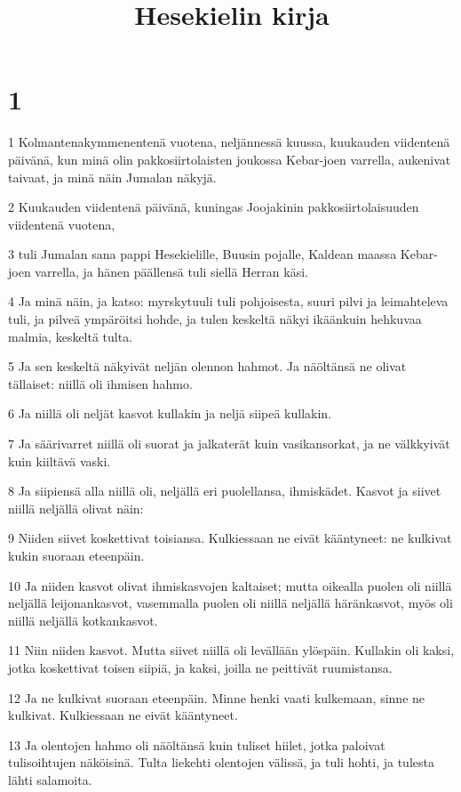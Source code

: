 

\title{Hesekielin kirja}


\chapter{1}

\par 1 Kolmantenakymmenentenä vuotena, neljännessä kuussa, kuukauden viidentenä päivänä, kun minä olin pakkosiirtolaisten joukossa Kebar-joen varrella, aukenivat taivaat, ja minä näin Jumalan näkyjä.
\par 2 Kuukauden viidentenä päivänä, kuningas Joojakinin pakkosiirtolaisuuden viidentenä vuotena,
\par 3 tuli Jumalan sana pappi Hesekielille, Buusin pojalle, Kaldean maassa Kebar-joen varrella, ja hänen päällensä tuli siellä Herran käsi.
\par 4 Ja minä näin, ja katso: myrskytuuli tuli pohjoisesta, suuri pilvi ja leimahteleva tuli, ja pilveä ympäröitsi hohde, ja tulen keskeltä näkyi ikäänkuin hehkuvaa malmia, keskeltä tulta.
\par 5 Ja sen keskeltä näkyivät neljän olennon hahmot. Ja näöltänsä ne olivat tällaiset: niillä oli ihmisen hahmo.
\par 6 Ja niillä oli neljät kasvot kullakin ja neljä siipeä kullakin.
\par 7 Ja säärivarret niillä oli suorat ja jalkaterät kuin vasikansorkat, ja ne välkkyivät kuin kiiltävä vaski.
\par 8 Ja siipiensä alla niillä oli, neljällä eri puolellansa, ihmiskädet. Kasvot ja siivet niillä neljällä olivat näin:
\par 9 Niiden siivet koskettivat toisiansa. Kulkiessaan ne eivät kääntyneet: ne kulkivat kukin suoraan eteenpäin.
\par 10 Ja niiden kasvot olivat ihmiskasvojen kaltaiset; mutta oikealla puolen oli niillä neljällä leijonankasvot, vasemmalla puolen oli niillä neljällä häränkasvot, myös oli niillä neljällä kotkankasvot.
\par 11 Niin niiden kasvot. Mutta siivet niillä oli levällään ylöspäin. Kullakin oli kaksi, jotka koskettivat toisen siipiä, ja kaksi, joilla ne peittivät ruumistansa.
\par 12 Ja ne kulkivat suoraan eteenpäin. Minne henki vaati kulkemaan, sinne ne kulkivat. Kulkiessaan ne eivät kääntyneet.
\par 13 Ja olentojen hahmo oli näöltänsä kuin tuliset hiilet, jotka paloivat tulisoihtujen näköisinä. Tulta liekehti olentojen välissä, ja tuli hohti, ja tulesta lähti salamoita.
